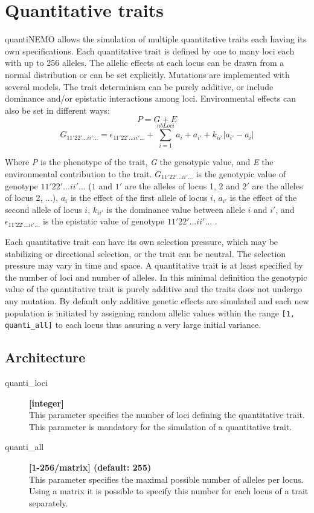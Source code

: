 \documentclass[letterpaper,12pt,oneside]{book}
\begin{document}
\newpage
\chapter{Quantitative traits}\label{quanti}
quantiNEMO allows the simulation of multiple quantitative traits each having its own specifications. Each quantitative trait is defined by one to many loci each with up to 256 alleles. The allelic effects at each locus can be drawn from a normal distribution or can be set explicitly. Mutations are implemented with several models. The trait determinism can be purely additive, or include dominance and/or epistatic interactions among loci. Environmental effects can also be set in different ways:
	\[P = G + E\]	
\[G_{11'22'...ii'...}=\epsilon_{11'22'...ii'...}+\sum_{i=1}^{nbLoci}a_i+a_{i'}+k_{ii'}|a_{i'}-a_i| \]

Where \textit{P} is the phenotype of the trait, \textit{G} the genotypic value, and \textit{E} the environmental contribution to the trait. $G_{11'22'...ii'...}$ is the genotypic value of genotype ${11'22'...ii'...}$ ($1$ and $1'$ are the alleles of locus 1, $2$ and $2'$ are the alleles of locus 2, ...), $a_i$ is the effect of the first allele of locus $i$, $a_{i'}$ is the effect of the second allele of locus $i$, $k_{ii'}$ is the dominance value between allele $i$ and $i'$, and $\epsilon_{11'22'...ii'...}$ is the epistatic value of genotype $11'22'...ii'...$ . 

Each quantitative trait can have its own selection pressure, which may be stabilizing or directional selection, or the trait can be neutral. The selection pressure may vary in time and space.
A quantitative trait is at least specified by the number of loci and number of alleles. In this minimal definition the genotypic value of the quantitative trait is purely additive and the traits does not undergo any mutation. By default only additive genetic effects are simulated and each new population is initiated by assigning random allelic values within the range \texttt{[1, quanti\_all]} to each locus thus assuring a very large initial variance. 

\section{Architecture}
\begin{description}

\item[quanti\_loci] \textbf{[integer]}\\
This parameter specifies the number of loci defining the quantitative trait. This parameter is mandatory for the simulation of a quantitative trait.

\item[quanti\_all] \textbf{[1-256/matrix] (default: 255)}\\
This parameter specifies the maximal possible number of alleles per locus. Using a matrix it is possible to specify this number for each locus of a trait separately.
\end{description}
\end{document}
